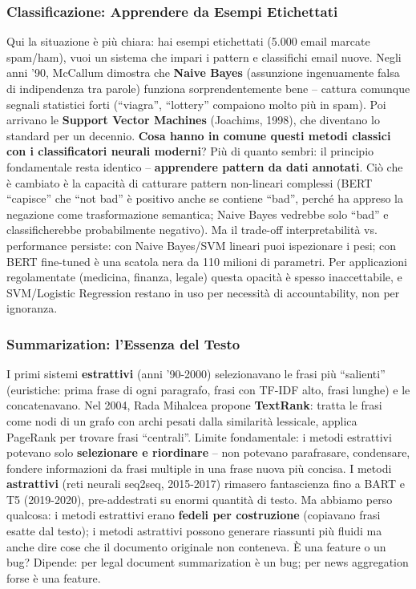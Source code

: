 \documentclass[12pt,a4paper]{article}
\begin{document}
\subsubsection{Classificazione: Apprendere da Esempi Etichettati}

Qui la situazione \`e pi\`u chiara: hai esempi etichettati (5.000 email marcate spam/ham), vuoi un sistema che impari i pattern e classifichi email nuove. Negli anni '90, McCallum dimostra che \textbf{Naive Bayes} (assunzione ingenuamente falsa di indipendenza tra parole) funziona sorprendentemente bene -- cattura comunque segnali statistici forti (``viagra'', ``lottery'' compaiono molto pi\`u in spam). Poi arrivano le \textbf{Support Vector Machines} (Joachims, 1998), che diventano lo standard per un decennio. \textbf{Cosa hanno in comune questi metodi classici con i classificatori neurali moderni}? Pi\`u di quanto sembri: il principio fondamentale resta identico -- \textbf{apprendere pattern da dati annotati}. Ci\`o che \`e cambiato \`e la capacit\`a di catturare pattern non-lineari complessi (BERT ``capisce'' che ``not bad'' \`e positivo anche se contiene ``bad'', perch\'e ha appreso la negazione come trasformazione semantica; Naive Bayes vedrebbe solo ``bad'' e classificherebbe probabilmente negativo). Ma il trade-off interpretabilit\`a vs. performance persiste: con Naive Bayes/SVM lineari puoi ispezionare i pesi; con BERT fine-tuned \`e una scatola nera da 110 milioni di parametri. Per applicazioni regolamentate (medicina, finanza, legale) questa opacit\`a \`e spesso inaccettabile, e SVM/Logistic Regression restano in uso per necessit\`a di accountability, non per ignoranza.

\subsubsection{Summarization: l'Essenza del Testo}

I primi sistemi \textbf{estrattivi} (anni '90-2000) selezionavano le frasi pi\`u ``salienti'' (euristiche: prima frase di ogni paragrafo, frasi con TF-IDF alto, frasi lunghe) e le concatenavano. Nel 2004, Rada Mihalcea propone \textbf{TextRank}: tratta le frasi come nodi di un grafo con archi pesati dalla similarit\`a lessicale, applica PageRank per trovare frasi ``centrali''. Limite fondamentale: i metodi estrattivi potevano solo \textbf{selezionare e riordinare} -- non potevano parafrasare, condensare, fondere informazioni da frasi multiple in una frase nuova pi\`u concisa. I metodi \textbf{astrattivi} (reti neurali seq2seq, 2015-2017) rimasero fantascienza fino a BART e T5 (2019-2020), pre-addestrati su enormi quantit\`a di testo. Ma abbiamo perso qualcosa: i metodi estrattivi erano \textbf{fedeli per costruzione} (copiavano frasi esatte dal testo); i metodi astrattivi possono generare riassunti pi\`u fluidi ma anche dire cose che il documento originale non conteneva. \`E una feature o un bug? Dipende: per legal document summarization \`e un bug; per news aggregation forse \`e una feature.
\end{document}
